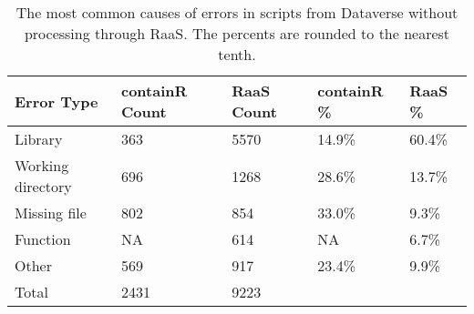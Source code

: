 \begin{table}
\centering
\caption{The most common causes of errors in scripts from Dataverse without processing through RaaS. The percents are rounded to the nearest tenth.}
\label{tab:error-causes}
\begin{tabular}{lllll}
\toprule
       Error Type & containR Count & RaaS Count & containR \% & RaaS \% \\
\midrule
          Library &            363 &       5570 &      14.9\% &  60.4\% \\ \hline
Working directory &            696 &       1268 &      28.6\% &  13.7\% \\ \hline
     Missing file &            802 &        854 &      33.0\% &   9.3\% \\ \hline
         Function &             NA &        614 &         NA &   6.7\% \\ \hline
            Other &            569 &        917 &      23.4\% &   9.9\% \\ \hline
            Total &           2431 &       9223 &            &        \\
\bottomrule
\end{tabular}
\end{table}
